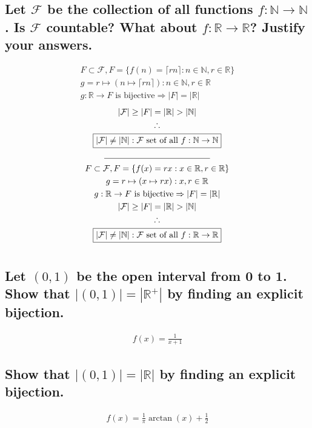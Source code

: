 \documentclass[letterpaper]{article}
\begin{document}
\subsection{Let $\mathcal{F}$ be the collection of all functions $f:\mathbb{N}\rightarrow\mathbb{N}$. Is $\mathcal{F}$ countable? What about $f:\mathbb{R}\rightarrow\mathbb{R}$? Justify your answers.}
\begin{gather*}
F\subset\mathcal{F},F=\{f(n)=\lceil rn\rceil:n\in\mathbb{N},r\in\mathbb{R}\} \\
g=r\mapsto(n\mapsto\lceil rn\rceil):n\in\mathbb{N},r\in\mathbb{R} \\
g:\mathbb{R}\rightarrow F\text{ is bijective}\Rightarrow|F|=|\mathbb{R}|
\end{gather*}
\begin{gather*}
|\mathcal{F}|\geq|F|=|\mathbb{R}|>|\mathbb{N}| \\
\therefore \\
\boxed{|\mathcal{F}|\neq|\mathbb{N}|:\mathcal{F}\text{ set of all }f:\mathbb{N}\rightarrow\mathbb{N}} \\
\line(1, 0){125} \\
F\subset\mathcal{F},F=\{f(x)=rx:x\in\mathbb{R},r\in\mathbb{R}\} \\
g=r\mapsto(x\mapsto rx):x,r\in\mathbb{R} \\
g:\mathbb{R}\rightarrow F\text{ is bijective}\Rightarrow|F|=|\mathbb{R}| \\
|\mathcal{F}|\geq|F|=|\mathbb{R}|>|\mathbb{N}| \\
\therefore \\
\boxed{|\mathcal{F}|\neq|\mathbb{N}|:\mathcal{F}\text{ set of all }f:\mathbb{R}\rightarrow\mathbb{R}} \\
\end{gather*}

\section{}
\subsection{Let $(0, 1)$ be the open interval from 0 to 1. Show that $|(0, 1)|=|\mathbb{R}^+|$ by finding an explicit bijection.}
\begin{gather*}
\boxed{f(x)=\frac{1}{x+1}}
\end{gather*}
\subsection{Show that $|(0, 1)|=|\mathbb{R}|$ by finding an explicit bijection.}
\begin{gather*}
\boxed{f(x)=\frac{1}{\pi}\arctan(x)+\frac{1}{2}}
\end{gather*}
\end{document}
